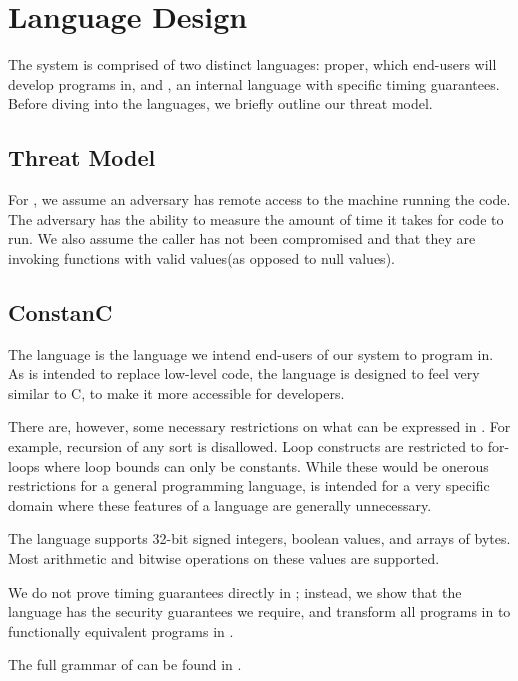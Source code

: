 \section{Language Design}
\label{sec:design}

The \constc system is comprised of two distinct languages: \constc proper, which end-users
will develop programs in, and \ccore, an internal language with specific timing guarantees. Before diving into the languages, we briefly outline our threat model.

\subsection{Threat Model}
For \constc, we assume an adversary has remote access to the machine running the code. The adversary has the ability to measure the amount of time it takes for \constc code to run. We also assume the caller has not been compromised and that they are invoking \constc functions with valid values(as opposed to null values).

\subsection{ConstanC}

The \constc language is the language we intend end-users of our system to program in.
As \constc is intended to replace low-level code, the language is designed to
feel very similar to C, to make it more accessible for developers.

There are, however, some necessary restrictions on what can be expressed in \constc.
For example, recursion of any sort is disallowed. Loop constructs are restricted to
for-loops where loop bounds can only be constants. While these would be onerous restrictions for a general
programming language, \constc is intended for a very specific domain where these
features of a language are generally unnecessary.

The language supports 32-bit signed integers, boolean values, and arrays of bytes.
Most arithmetic and bitwise operations on these values are supported.

We do not prove timing guarantees directly in \constc; instead, we show
that the \ccore language has the security guarantees we require, and transform all programs
in \constc to functionally equivalent programs in \ccore.

The full grammar of \constc can be found in .

